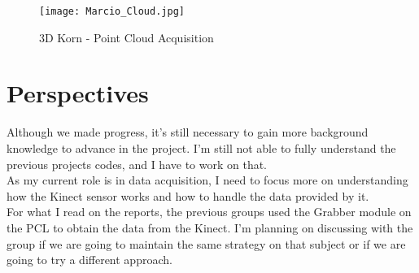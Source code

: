 \documentclass[aps,letterpaper,11pt]{revtex4}
\begin{document}
\begin{figure}[!htb]
\centering
\texttt{[image: Marcio\_Cloud.jpg]}
\caption{3D Korn - Point Cloud Acquisition}
\end{figure}

\section{Perspectives}
Although we made progress, it's still necessary to gain more background knowledge to advance in the project. I'm still not able to fully understand the previous projects codes, and I have to work on that.\\
\indent As my current role is in data acquisition, I need to focus more on understanding how the Kinect sensor works and how to handle the data provided by it.\\
\indent For what I read on  the reports, the previous groups used the Grabber module on the PCL to obtain the data from the Kinect. I'm planning on discussing with the group if we are going to maintain the same strategy on that subject or if we are going to try a different approach.\\
\end{document}
